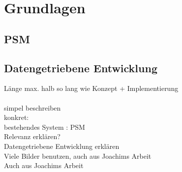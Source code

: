 \chapter{Grundlagen}\label{ch:grundlagen}

\section{PSM}
\section{Datengetriebene Entwicklung}

Länge max. halb so lang wie Konzept + Implementierung\\
\\
simpel beschreiben\\
konkret:\\
bestehendes System : PSM\\
Relevanz erklären?\\
Datengetriebene Entwicklung erklären \\
Viele Bilder benutzen, auch aus Joachims Arbeit\\
Auch aus Joachims Arbeit \\


\begin{deprecated}
\cite{davis93}


\end{deprecated}

